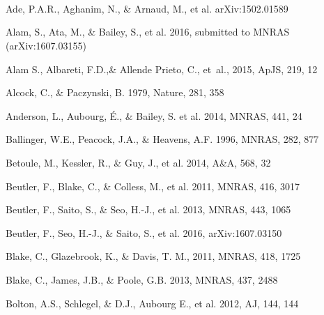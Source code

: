 \documentclass[iop]{emulateapj}
\begin{document}
\

\

\

\begin{thebibliography}{}

Ade, P.A.R., Aghanim, N., \& Arnaud, M., et al. arXiv:1502.01589

Alam, S., Ata, M., \& Bailey, S., et al. 2016,
submitted to MNRAS (arXiv:1607.03155)

{Alam} S., Albareti, F.D.,\& Allende Prieto, C., {et~al.}, 2015,  ApJS, 219, 12

Alcock, C., \& Paczynski, B. 1979, Nature, 281, 358  


Anderson, L., Aubourg, \'E., \& Bailey, S. et al. 2014, MNRAS, 441, 24  
  

Ballinger, W.E., Peacock, J.A., \& Heavens, A.F. 1996, MNRAS, 282, 877  

Betoule, M., Kessler, R., \& Guy, J., et al. 2014, A\&A, 568, 32


Beutler, F., Blake, C., \& Colless, M., et al. 2011, MNRAS, 416, 3017

Beutler, F., Saito, S., \& Seo, H.-J., et al. 2013, MNRAS, 443, 1065

Beutler, F., Seo, H.-J., \& Saito, S., et al. 2016,
arXiv:1607.03150

Blake, C., Glazebrook, K., \& Davis, T. M., 2011, MNRAS, 418, 1725  

Blake, C., James, J.B., \& Poole, G.B. 2013, MNRAS, 437, 2488

Bolton, A.S., Schlegel, \& D.J., Aubourg E., et al. 2012, AJ, 144, 144


\end{thebibliography}
\end{document}
